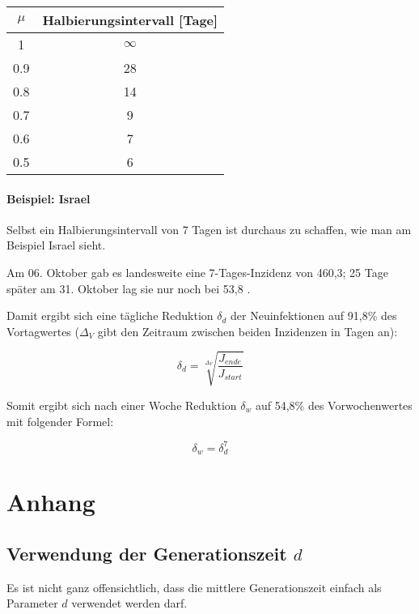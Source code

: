 \documentclass[a4paper]{article}
\begin{document}
    \begin{center}
        \begin{tabular}{ |c||c| } 
            \hline
                $\mu$ & Halbierungsintervall [Tage] \\
                \hline\hline
                1 & $\infty$ \\ 
                0.9 & 28 \\ 
                0.8 & 14 \\ 
                0.7 & 9 \\ 
                0.6 & 7 \\ 
                0.5 & 6 \\ 
            \hline
        \end{tabular}
    \end{center}

    \paragraph{Beispiel: Israel}Selbst ein Halbierungsintervall von 7 Tagen ist durchaus zu schaffen, wie man am Beispiel Israel sieht.

    Am 06. Oktober gab es landesweite eine 7-Tages-Inzidenz von 460,3; 25 Tage später am 31. Oktober lag sie nur noch bei 53,8 \cite{zeitOnline}. 

    Damit ergibt sich eine tägliche Reduktion $\delta_d$ der Neuinfektionen auf 91,8\% des Vortagwertes ($\Delta_V$ gibt den Zeitraum zwischen beiden Inzidenzen in Tagen an):

    \begin{equation}
        \delta_d = \sqrt[\Delta_{V}]{\frac{J_{ende}}{J_{start}}} 
    \end{equation}

    Somit ergibt sich nach einer Woche Reduktion $\delta_w$ auf 54,8\% des Vorwochenwertes mit folgender Formel:  
    
    $$ \delta_w = \delta_{d}^7 $$

    \section{Anhang}
    \subsection{Verwendung der Generationszeit $d$}
    Es ist nicht ganz offensichtlich, dass die mittlere Generationszeit einfach als Parameter $d$ verwendet werden darf. 
\end{document}

